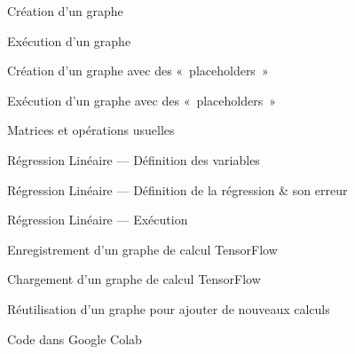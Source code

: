 \begin{frame}{Création d'un graphe}
\end{frame}


\begin{frame}{Exécution d'un graphe}
\end{frame}

\begin{frame}{Création d'un graphe avec des «~placeholders~»}
\end{frame}

\begin{frame}{Exécution d'un graphe avec des «~placeholders~»}
\end{frame}

\begin{frame}{Matrices et opérations usuelles}
\end{frame}

\begin{frame}{Régression Linéaire --- Définition des variables}
\end{frame}

\begin{frame}{Régression Linéaire --- Définition de la régression \& son erreur}
\end{frame}

\begin{frame}{Régression Linéaire --- Exécution}
\end{frame}

\begin{frame}{Enregistrement d'un graphe de calcul TensorFlow}
\end{frame}

\begin{frame}{Chargement d'un graphe de calcul TensorFlow}
\end{frame}

\begin{frame}{Réutilisation d'un graphe pour ajouter de nouveaux calculs}
\end{frame}

\begin{frame}{Code dans Google Colab}
\end{frame}
